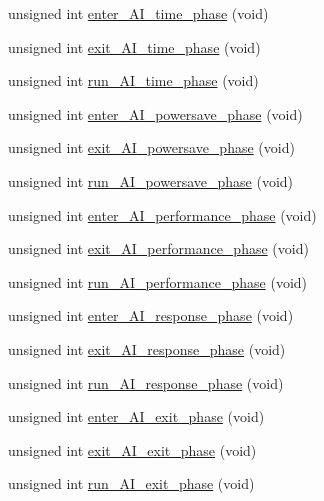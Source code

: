\begin{DoxyCompactItemize}
\item 
unsigned int \hyperlink{group__phase__functions_gaa1242148a42e9f88ff07b03d5920c4c8}{enter\+\_\+\+A\+I\+\_\+time\+\_\+phase} (void)
\item 
unsigned int \hyperlink{group__phase__functions_ga39d61c87ab6af0d46b6ed0f46c16fb0f}{exit\+\_\+\+A\+I\+\_\+time\+\_\+phase} (void)
\item 
unsigned int \hyperlink{group__phase__functions_ga03f61084843501f07105ba840b4ca344}{run\+\_\+\+A\+I\+\_\+time\+\_\+phase} (void)
\item 
unsigned int \hyperlink{group__phase__functions_gaf7784d81e13e0fe9e15b2fa2002ed5b5}{enter\+\_\+\+A\+I\+\_\+powersave\+\_\+phase} (void)
\item 
unsigned int \hyperlink{group__phase__functions_ga306c8c8d89a5e8f726977fab0a911524}{exit\+\_\+\+A\+I\+\_\+powersave\+\_\+phase} (void)
\item 
unsigned int \hyperlink{group__phase__functions_ga9c9370b516fe71ae193220f58e7b386e}{run\+\_\+\+A\+I\+\_\+powersave\+\_\+phase} (void)
\item 
unsigned int \hyperlink{group__phase__functions_ga941d3a0068309626010a099c01b67645}{enter\+\_\+\+A\+I\+\_\+performance\+\_\+phase} (void)
\item 
unsigned int \hyperlink{group__phase__functions_ga4a3bcbc98761324798a6db394d7ca003}{exit\+\_\+\+A\+I\+\_\+performance\+\_\+phase} (void)
\item 
unsigned int \hyperlink{group__phase__functions_gab944292e97a143709134badb5bb37a46}{run\+\_\+\+A\+I\+\_\+performance\+\_\+phase} (void)
\item 
unsigned int \hyperlink{group__phase__functions_ga542b61105ff06fddc65d04076fd21b51}{enter\+\_\+\+A\+I\+\_\+response\+\_\+phase} (void)
\item 
unsigned int \hyperlink{group__phase__functions_ga1d39d9724fbcc5a756fbdaf6c8da4d2e}{exit\+\_\+\+A\+I\+\_\+response\+\_\+phase} (void)
\item 
unsigned int \hyperlink{group__phase__functions_ga0a0b5f5f0651f624b53940e999c7cbb9}{run\+\_\+\+A\+I\+\_\+response\+\_\+phase} (void)
\item 
unsigned int \hyperlink{group__phase__functions_ga31721cdeeac61d3fd2784ffa362e8c3a}{enter\+\_\+\+A\+I\+\_\+exit\+\_\+phase} (void)
\item 
unsigned int \hyperlink{group__phase__functions_gac0e1dc9b48fd6559087b234400fe1960}{exit\+\_\+\+A\+I\+\_\+exit\+\_\+phase} (void)
\item 
unsigned int \hyperlink{group__phase__functions_ga419deaa6a184d9a065d716d9b08a82d0}{run\+\_\+\+A\+I\+\_\+exit\+\_\+phase} (void)
\end{DoxyCompactItemize}


